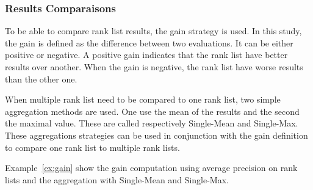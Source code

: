 \subsubsection{Results Comparaisons \label{sec:results_comparaison}}

To be able to compare rank list results, the gain strategy is used.
In this study, the gain is defined as the difference between two evaluations.
It can be either positive or negative.
A positive gain indicates that the rank list have better results over another.
When the gain is negative, the rank list have worse results than the other one.

When multiple rank list need to be compared to one rank list, two simple aggregation methods are used.
One use the mean of the results and the second the maximal value.
These are called respectively Single-Mean and Single-Max.
These aggregations strategies can be used in conjunction with the gain definition to compare one rank list to multiple rank lists.

Example~\ref{ex:gain} show the gain computation using average precision on rank lists and the aggregation with Single-Mean and Single-Max.

